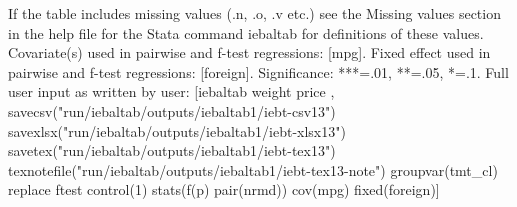 If the table includes missing values (.n, .o, .v etc.) see the Missing values section in the help file for the Stata command iebaltab for definitions of these values. Covariate(s) used in pairwise and f-test regressions: [mpg]. Fixed effect used in pairwise and f-test regressions: [foreign]. Significance: ***=.01, **=.05, *=.1. Full user input as written by user: [iebaltab weight price , savecsv("run/iebaltab/outputs/iebaltab1/iebt-csv13") savexlsx("run/iebaltab/outputs/iebaltab1/iebt-xlsx13") savetex("run/iebaltab/outputs/iebaltab1/iebt-tex13") texnotefile("run/iebaltab/outputs/iebaltab1/iebt-tex13-note") groupvar(tmt\_cl) replace ftest control(1) stats(f(p) pair(nrmd)) cov(mpg) fixed(foreign)] 
